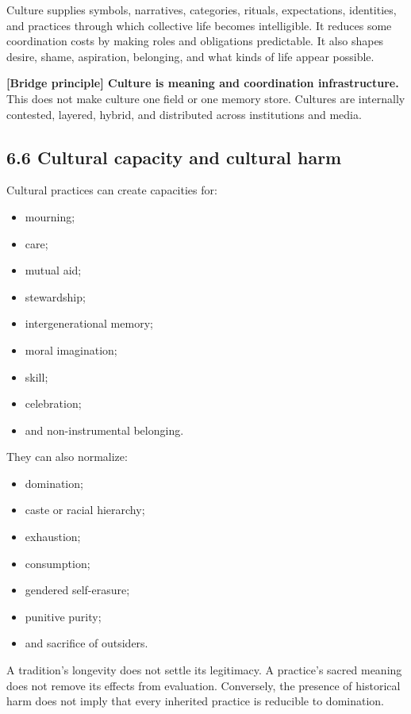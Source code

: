 \documentclass[
  11pt,
]{article}
\providecommand{\tightlist}{%
  \setlength{\itemsep}{0pt}\setlength{\parskip}{0pt}}
\begin{document}
Culture supplies symbols, narratives, categories, rituals, expectations,
identities, and practices through which collective life becomes
intelligible. It reduces some coordination costs by making roles and
obligations predictable. It also shapes desire, shame, aspiration,
belonging, and what kinds of life appear possible.

\textbf{{[}Bridge principle{]} Culture is meaning and coordination
infrastructure.} This does not make culture one field or one memory
store. Cultures are internally contested, layered, hybrid, and
distributed across institutions and media.

\subsection{6.6 Cultural capacity and cultural
harm}\label{cultural-capacity-and-cultural-harm}

Cultural practices can create capacities for:

\begin{itemize}
\tightlist
\item
  mourning;
\item
  care;
\item
  mutual aid;
\item
  stewardship;
\item
  intergenerational memory;
\item
  moral imagination;
\item
  skill;
\item
  celebration;
\item
  and non-instrumental belonging.
\end{itemize}

They can also normalize:

\begin{itemize}
\tightlist
\item
  domination;
\item
  caste or racial hierarchy;
\item
  exhaustion;
\item
  consumption;
\item
  gendered self-erasure;
\item
  punitive purity;
\item
  and sacrifice of outsiders.
\end{itemize}

A tradition's longevity does not settle its legitimacy. A practice's
sacred meaning does not remove its effects from evaluation. Conversely,
the presence of historical harm does not imply that every inherited
practice is reducible to domination.
\end{document}
